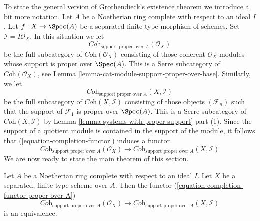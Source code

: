 \noindent
To state the general version of Grothendieck's existence theorem
we introduce a bit more notation. Let $A$ be a Noetherian ring
complete with respect to an ideal $I$. Let $f : X \to \Spec(A)$
be a separated finite type morphism of schemes. Set
$\mathcal{I} = I\mathcal{O}_X$. In this situation we let
$$
\textit{Coh}_{\text{support proper over } A}(\mathcal{O}_X)
$$
be the full subcategory of $\textit{Coh}(\mathcal{O}_X)$
consisting of those coherent $\mathcal{O}_X$-modules whose
support is proper over $\Spec(A)$. This is a Serre subcategory of
$\textit{Coh}(\mathcal{O}_X)$, see
Lemma \ref{lemma-cat-module-support-proper-over-base}.
Similarly, we let
$$
\textit{Coh}_{\text{support proper over } A}(X, \mathcal{I})
$$
be the full subcategory of $\textit{Coh}(X, \mathcal{I})$
consisting of those objects $(\mathcal{F}_n)$ such that
the support of $\mathcal{F}_1$ is proper over $\Spec(A)$.
This is a Serre subcategory of $\textit{Coh}(X, \mathcal{I})$
by Lemma \ref{lemma-systems-with-proper-support} part (1).
Since the support of a quotient module is contained in the support
of the module, it follows that (\ref{equation-completion-functor})
induces a functor
\begin{equation}
\label{equation-completion-functor-proper-over-A}
\textit{Coh}_{\text{support proper over }A}(\mathcal{O}_X)
\longrightarrow
\textit{Coh}_{\text{support proper over }A}(X, \mathcal{I})
\end{equation}
We are now ready to state the main theorem of this section.

\begin{theorem}
\label{theorem-grothendieck-existence}
\begin{reference}
\cite[III Theorem 5.1.5]{EGA}
\end{reference}
Let $A$ be a Noetherian ring complete with respect to an ideal $I$.
Let $X$ be a separated, finite type scheme over $A$. Then
the functor
(\ref{equation-completion-functor-proper-over-A})
$$
\textit{Coh}_{\text{support proper over }A}(\mathcal{O}_X)
\longrightarrow
\textit{Coh}_{\text{support proper over }A}(X, \mathcal{I})
$$
is an equivalence.
\end{theorem}

